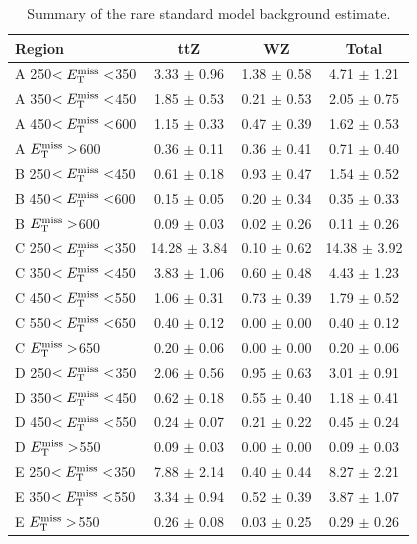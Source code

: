 \begin{table}[htbp]
\centering
\caption{Summary of the rare standard model background
  estimate.}
\label{tab:stop:rarebkg:results}
\begin{tabular}{|l|cc|c|}
\hline
Region & ttZ & WZ & Total  \\
\hline
 A 250$<E_\text{T}^\text{miss}<$350 & 3.33 $\pm$ 0.96   & 1.38 $\pm$ 0.58   & 4.71 $\pm$ 1.21   \\
 A 350$<E_\text{T}^\text{miss}<$450 & 1.85 $\pm$ 0.53   & 0.21 $\pm$ 0.53   & 2.05 $\pm$ 0.75   \\
 A 450$<E_\text{T}^\text{miss}<$600 & 1.15 $\pm$ 0.33   & 0.47 $\pm$ 0.39   & 1.62 $\pm$ 0.53   \\
 A $E_\text{T}^\text{miss}>$600 & 0.36 $\pm$ 0.11   & 0.36 $\pm$ 0.41   & 0.71 $\pm$ 0.40   \\
 B 250$<E_\text{T}^\text{miss}<$450 & 0.61 $\pm$ 0.18   & 0.93 $\pm$ 0.47   & 1.54 $\pm$ 0.52   \\
 B 450$<E_\text{T}^\text{miss}<$600 & 0.15 $\pm$ 0.05   & 0.20 $\pm$ 0.34   & 0.35 $\pm$ 0.33   \\
 B $E_\text{T}^\text{miss}>$600 & 0.09 $\pm$ 0.03   & 0.02 $\pm$ 0.26   & 0.11 $\pm$ 0.26   \\
 C 250$<E_\text{T}^\text{miss}<$350 & 14.28 $\pm$ 3.84  & 0.10 $\pm$ 0.62   & 14.38 $\pm$ 3.92  \\
 C 350$<E_\text{T}^\text{miss}<$450 & 3.83 $\pm$ 1.06   & 0.60 $\pm$ 0.48   & 4.43 $\pm$ 1.23   \\
 C 450$<E_\text{T}^\text{miss}<$550 & 1.06 $\pm$ 0.31   & 0.73 $\pm$ 0.39   & 1.79 $\pm$ 0.52   \\
 C 550$<E_\text{T}^\text{miss}<$650 & 0.40 $\pm$ 0.12   & 0.00 $\pm$ 0.00   & 0.40 $\pm$ 0.12   \\
 C $E_\text{T}^\text{miss}>$650 & 0.20 $\pm$ 0.06   & 0.00 $\pm$ 0.00   & 0.20 $\pm$ 0.06   \\
 D 250$<E_\text{T}^\text{miss}<$350 & 2.06 $\pm$ 0.56   & 0.95 $\pm$ 0.63   & 3.01 $\pm$ 0.91   \\
 D 350$<E_\text{T}^\text{miss}<$450 & 0.62 $\pm$ 0.18   & 0.55 $\pm$ 0.40   & 1.18 $\pm$ 0.41   \\
 D 450$<E_\text{T}^\text{miss}<$550 & 0.24 $\pm$ 0.07   & 0.21 $\pm$ 0.22   & 0.45 $\pm$ 0.24   \\
 D $E_\text{T}^\text{miss}>$550 & 0.09 $\pm$ 0.03   & 0.00 $\pm$ 0.00   & 0.09 $\pm$ 0.03   \\
 E 250$<E_\text{T}^\text{miss}<$350 & 7.88 $\pm$ 2.14   & 0.40 $\pm$ 0.44   & 8.27 $\pm$ 2.21   \\
 E 350$<E_\text{T}^\text{miss}<$550 & 3.34 $\pm$ 0.94   & 0.52 $\pm$ 0.39   & 3.87 $\pm$ 1.07   \\
 E $E_\text{T}^\text{miss}>$550 & 0.26 $\pm$ 0.08   & 0.03 $\pm$ 0.25   & 0.29 $\pm$ 0.26   \\

\end{tabular}
\end{table}
